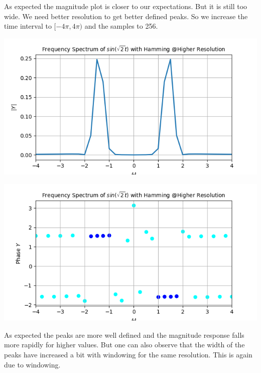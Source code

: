 \documentclass[12pt, a4paper]{report}
\begin{document}
As expected the magnitude plot is closer to our expectations. But it is still too wide. We need better resolution to get better defined peaks. So we increase the time interval to $[−4 \pi, 4 \pi)$ and the samples to 256.

\begin{center}
	\includegraphics[scale=0.75]{Figure_8.png} 
	\label{fig:rawdata}
\end{center}
\clearpage

\begin{center}
	\includegraphics[scale=0.75]{Figure_9.png} 
	\label{fig:rawdata}
\end{center}
As expected the peaks are more well defined and the magnitude response falls more rapidly for higher values. But one can also observe that the width of the peaks have increased a bit with windowing for the same resolution. This is again due to windowing.


\\
\\
\end{document}
